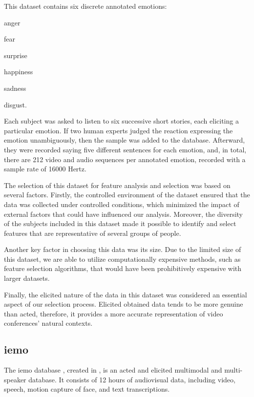 This dataset contains six discrete annotated emotions: \begin{enumerate*}\item anger \item fear \item surprise \item happiness \item sadness \item disgust. \end{enumerate*} Each subject was asked to listen to six successive short stories, each eliciting a particular emotion. If two human experts judged the reaction expressing the emotion unambiguously, then the sample was added to the database. Afterward, they were recorded saying five different sentences for each emotion, and, in total, there are 212 video and audio sequences per annotated emotion, recorded with a sample rate of 16000 Hertz.

The selection of this dataset for feature analysis and selection was based on several factors. Firstly, the controlled environment of the dataset ensured that the data was collected under controlled conditions, which minimized the impact of external factors that could have influenced our analysis. Moreover, the diversity of the subjects included in this dataset made it possible to identify and select features that are representative of several groups of people.

Another key factor in choosing this data was its size. Due to the limited size of this dataset, we are able to utilize computationally expensive methods, such as feature selection algorithms, that would have been prohibitively expensive with larger datasets.

Finally, the elicited nature of the data in this dataset was considered an essential aspect of our selection process. Elicited obtained data tends to be more genuine than acted, therefore, it provides a more accurate representation of video conferences' natural contexts.

\subsection{\ac{iemo}}

The \ac{iemo} database \cite{Busso2008}, created in \citeyear{Busso2008}, is an acted and elicited multimodal and multi-speaker database. It consists of 12 hours of audiovisual data, including video, speech, motion capture of face, and text transcriptions.

